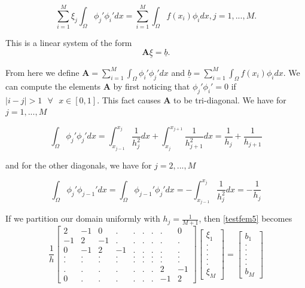 \documentclass[a4paper]{article}
\newcommand\abs[1]{\left|#1\right|}
\theoremstyle{remark}
\theoremstyle{remark}
\begin{document}
\begin{equation}\label{testfem4}
\sum_{i=1}^{M}\xi_{j}\int_{\Omega} \phi_{j}'\phi_{i}'dx=\sum_{i=1}^{M} \int_{\Omega} f\left(x_{i}\right)\phi_{i}dx, j=1,...,M.
\end{equation}

\noindent This is a linear system of the form 
\begin{equation}\label{testfem5}
\mathbf{A}\underline{\xi}=\underline{b}.
\end{equation}

\noindent From here we define $\mathbf{A}=\sum_{i=1}^{M}\int_{\Omega} \phi_{i}'\phi_{j}'dx$ and $\underline{b}=\sum_{i=1}^{M} \int_{\Omega} f\left(x_{i}\right)\phi_{i}dx$.
We can compute the elements $\mathbf{A}$ by first noticing that $\phi_{j}'\phi_{i}'=0$ if $\abs{i-j}>1 \texttt{ } \forall \texttt{ } x\in [0,1]$. This fact causes $\mathbf{A}$ to be tri-diagonal. We have for $j=1,...,M$

\begin{equation} \label{testfem6}
\int_{\Omega} \phi_{j}'\phi_{j}'dx=\int_{x_{j-1}}^{x_{j}} \frac{1}{h_{j}^{2}}dx+\int_{x_{j}}^{x_{j+1}} \frac{1}{h_{j+1}^{2}}dx = \frac{1}{h_{j}}+\frac{1}{h_{j+1}} 
\end{equation}

\noindent and for the other diagonals, we have for $j=2,...,M$

\begin{equation}
\int_{\Omega} \phi_{j}'\phi_{j-1}'dx=\int_{\Omega} \phi_{j-1}'\phi_{j}'dx=-\int_{x_{j-1}}^{x_{j}} \frac{1}{h_{j}^{2}}dx=-\frac{1}{h_{j}} 
\end{equation}

\noindent If we partition our domain uniformly with $h_{j}=\frac{1}{M+1}$, then \eqref{testfem5} becomes
\begin{equation}\label{testfem7}
\frac{1}{h}\begin{bmatrix}
2 & -1 & 0 & . & . & . & . & . & 0\\
-1 & 2 & -1 & . & . & . & . & . & .\\
0 & -1 & 2 & -1  & . & . & . & . & .\\
. & . & . & . & . & . & . & . & .\\
. & . & . & . & . & . & . & . & .\\
. & . & . & . & . & . & . & 2 & -1\\
0 & . & . & . & . & . & . & -1 & 2
\end{bmatrix}
\begin{bmatrix}
\xi_{1}\\
.\\
.\\
.\\
.\\
.\\
\xi_{M}
\end{bmatrix}
=
\begin{bmatrix}
b_{1}\\
.\\
.\\
.\\
.\\
.\\
b_{M}
\end{bmatrix}
\end{equation}
\end{document}
